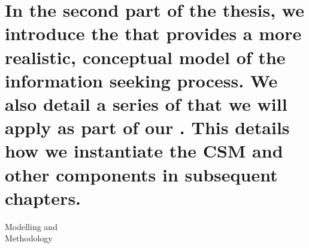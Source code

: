 
\newcommand{\partheaderimage}{figures/p2-header}
\part[Modelling and Methodology]{In the second part of the thesis, we introduce the  that provides a more realistic, conceptual model of the information seeking process. We also detail a series of  that we will apply as part of our . This details how we instantiate the CSM and other components in subsequent chapters.}{Modelling and\\Methodology}\label{part:stopping}
